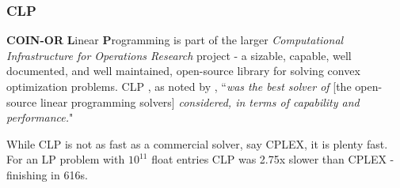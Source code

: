 \documentclass{beamer}
\begin{document}
\begin{frame}
\frametitle{CLP}

    \textbf{COIN-OR} \textbf{L}inear \textbf{P}rogramming is part of the larger
    \textit{Computational Infrastructure for Operations Research} project
    - a sizable, capable, well documented, and well maintained, open-source
     library for solving convex optimization problems. CLP
     , as noted by 
     \cite{gearhart_comparison_2013}, ``\textit{was the best solver of} [the open-source linear programming solvers] \textit{considered, in terms of
     capability and performance.}"

     \par

     While CLP is not as fast as a commercial solver, say CPLEX, it is plenty
     fast. For an LP problem with $10^{11}$ float entries CLP was 2.75x slower
     than CPLEX - finishing in 616s. 

\end{frame}
\end{document}
